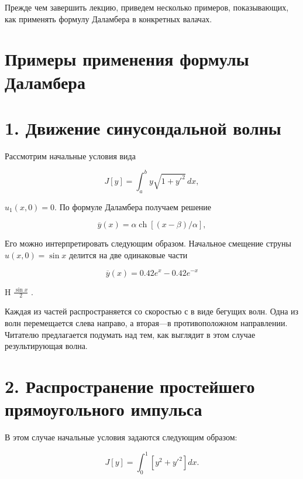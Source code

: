 \documentclass[
  ukrainian,
]{article}
\begin{document}
Прежде чем завершить лекцию, приведем несколько примеров, показывающих,
как применять формулу Даламбера в конкретных валачах.

\section{Примеры применения формулы
Даламбера}\label{ux43fux440ux438ux43cux435ux440ux44b-ux43fux440ux438ux43cux435ux43dux435ux43dux438ux44f-ux444ux43eux440ux43cux443ux43bux44b-ux434ux430ux43bux430ux43cux431ux435ux440ux430}

\section{1. Движение синусондальной
волны}\label{ux434ux432ux438ux436ux435ux43dux438ux435-ux441ux438ux43dux443ux441ux43eux43dux434ux430ux43bux44cux43dux43eux439-ux432ux43eux43bux43dux44b}

Рассмотрим начальные условия вида

\[
J[y] = \int_a^b y \sqrt{1 + y'^2} \, dx,
\]

\(u_1(x, 0) = 0.\) По формуле Даламбера получаем решение

\[
\overline{y}(x) = \alpha \operatorname{ch}[(x-\beta)/\alpha],
\]

Его можно интерпретировать следующим образом. Начальное смещение струны
\(u(x, 0) = \sin x\) делится на две одинаковые части

\[
\overline{y}(x) = 0.42e^x - 0.42e^{-x}
\]

H \(\frac{\sin x}{2}\) .

Каждая из частей распространяется со скоростью с в виде бегущих волн.
Одна из волн перемещается слева направо, а вторая---в противоположном
направлении. Читателю предлагается подумать над тем, как выглядит в этом
случае результирующая волна.

\section{2. Распространение простейшего прямоугольного
импульса}\label{ux440ux430ux441ux43fux440ux43eux441ux442ux440ux430ux43dux435ux43dux438ux435-ux43fux440ux43eux441ux442ux435ux439ux448ux435ux433ux43e-ux43fux440ux44fux43cux43eux443ux433ux43eux43bux44cux43dux43eux433ux43e-ux438ux43cux43fux443ux43bux44cux441ux430}

В этом случае начальные условия задаются следующим образом:

\[
J[y] = \int_{0}^{1} [y^{2} + y'^{2}] dx.
\]
\end{document}
